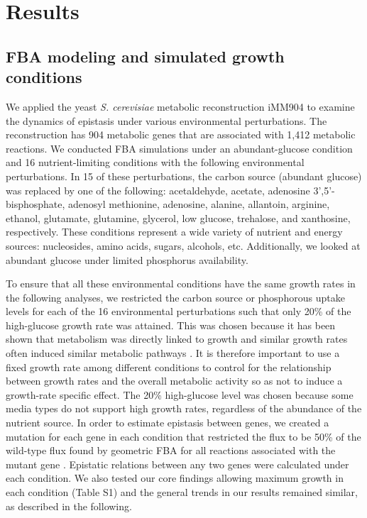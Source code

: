 \section{Results}

\subsection{FBA modeling and simulated growth conditions}

We applied the yeast \textit{S. cerevisiae} metabolic reconstruction
iMM904 \citep{Mo2009} to examine the dynamics of epistasis under various
environmental perturbations. The reconstruction has 904 metabolic
genes that are associated with 1,412 metabolic reactions. We conducted
FBA simulations under an abundant-glucose condition and 16
nutrient-limiting conditions with the following environmental
perturbations. In 15 of these perturbations, the carbon source
(abundant glucose) was replaced by one of the following: acetaldehyde,
acetate, adenosine 3',5'-bisphosphate, adenosyl methionine, adenosine,
alanine, allantoin, arginine, ethanol, glutamate, glutamine, glycerol,
low glucose, trehalose, and xanthosine, respectively. These conditions
represent a wide variety of nutrient and energy sources: nucleosides,
amino acids, sugars, alcohols, etc. Additionally, we looked at
abundant glucose under limited phosphorus availability.

To ensure that all these environmental conditions have the same growth
rates in the following analyses, we restricted the carbon source or
phosphorous uptake levels for each of the 16 environmental
perturbations such that only 20\% of the high-glucose growth rate was
attained. This was chosen because it has been shown that metabolism
was directly linked to growth and similar growth rates often induced
similar metabolic pathways \citep{Jakubowska2012}. It is therefore
important to use a fixed growth rate among different conditions to
control for the relationship between growth rates and the overall
metabolic activity so as not to induce a growth-rate specific
effect. The 20\% high-glucose level was chosen because some media
types do not support high growth rates, regardless of the abundance of
the nutrient source. In order to estimate epistasis between genes, we
created a mutation for each gene in each condition that restricted the
flux to be 50\% of the wild-type flux found by geometric FBA for all
reactions associated with the mutant gene \citep{Xu2012}. Epistatic relations
between any two genes were calculated under each condition. We also
tested our core findings allowing maximum growth in each condition
(Table S1) and the general trends in our results remained similar, as
described in the following.

